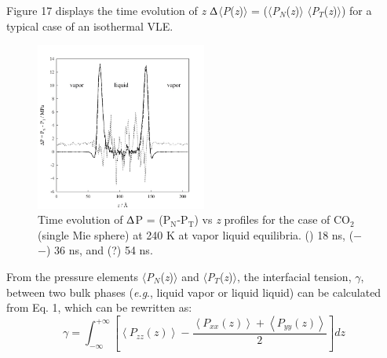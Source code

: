 \documentclass[9pt,bestpractices]{livecoms}
\begin{document}
Figure 17 displays the time evolution of \textit{z} \textendash{}
${\Updelta}$${\langle}$\textit{P}(\textit{z})${\rangle}$
= (${\langle}$\textit{P}$_{N}$(\textit{z})${\rangle}$ \textendash{}
${\langle}$\textit{P}$_{T}$(\textit{z})${\rangle}$) for a typical case of an
isothermal VLE. 
\begin{figure}
\includegraphics[width=0.5\textwidth]{gfx/image61.jpeg}
\caption{Time evolution of {${\Updelta}$}P = (P$_{\mathrm{N}}$-P$_{\mathrm{T}}$) vs \textit{z} profiles for the case of CO$_{2}$ (single Mie sphere) at 240 K at vapor \textendash{} liquid equilibria. ({\textbullet}{\textbullet}{\textbullet}) 18 ns, (${-}$ ${-}$) 36 ns, and (?) 54 ns.}
\label{fig:17}
\end{figure}
From the pressure elements ${\langle}$\textit{P}$_{N}$(\textit{z})${\rangle}$
and ${\langle}$\textit{P}$_{T}$(\textit{z})${\rangle}$, the interfacial
tension, ${\gamma}$, between two bulk phases (\textit{e.g}., liquid
\textendash{} vapor or liquid \textendash{} liquid) can be calculated from Eq.
1, which can be rewritten as:
\begin{equation}
\gamma=\int_{{\scriptstyle -\infty}}^{{\scriptstyle +\infty}}\left[\left\langle P_{zz}\left(z\right)\right\rangle -\frac{\left\langle P_{xx}\left(z\right)\right\rangle +\left\langle P_{yy}\left(z\right)\right\rangle }{2}\right]dz
\end{equation}
\end{document}
